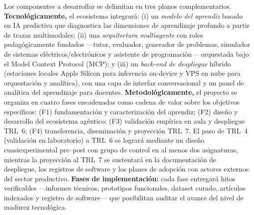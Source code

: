
 Los componentes a desarrollar se delimitan en tres planos complementarios. \textbf{Tecnológicamente,} el ecosistema integrará: (i) un \emph{modelo del aprendiz} basado en IA predictiva que diagnostica las dimensiones de aprendizaje profundo a partir de trazas multimodales; (ii) una \emph{arquitectura multiagente} con roles pedagógicamente fundados —tutor, evaluador, generador de problemas, simulador de sistemas eléctricos/electrónicos y asistente de programación— orquestada bajo el Model Context Protocol (MCP); y (iii) un \emph{back-end de despliegue} híbrido (estaciones locales Apple Silicon para inferencia on-device y VPS en nube para orquestación y analítica), con una capa de interfaz conversacional y un panel de analítica del aprendizaje para docentes. \textbf{Metodológicamente,} el proyecto se organiza en cuatro fases encadenadas como cadena de valor sobre los objetivos específicos: (F1) fundamentación y caracterización del aprendiz; (F2) diseño y desarrollo del ecosistema agéntico; (F3) validación empírica en aula y despliegue TRL~6; (F4) transferencia, diseminación y proyección TRL~7. El paso de TRL~4 (validación en laboratorio) a TRL~6 se logrará mediante un diseño cuasiexperimental pre--post con grupo de control en al menos dos asignaturas, mientras la proyección al TRL~7 se sustentará en la documentación de despliegue, los registros de software y los planes de adopción con actores externos del sector productivo. \textbf{Fases de implementación:} cada fase entregará hitos verificables —informes técnicos, prototipos funcionales, dataset curado, artículos indexados y registro de software— que posibilitan auditar el avance del nivel de madurez tecnológica.


